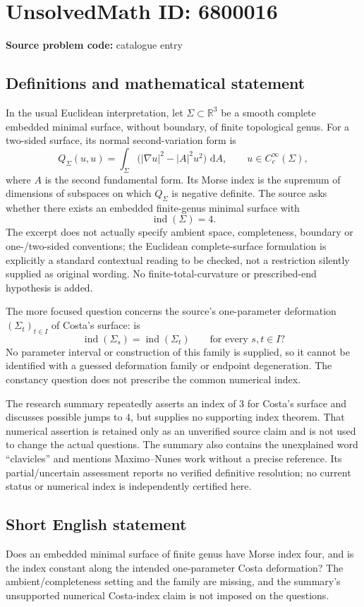 \documentclass[11pt]{article}
\newcommand{\dd}{\,\mathrm{d}}
\begin{document}
\section*{UnsolvedMath ID: 6800016}
\textbf{Source problem code:} catalogue entry
\subsection{Definitions and mathematical statement}
In the usual Euclidean interpretation, let \(\Sigma\subset\mathbb R^3\) be a smooth complete embedded minimal surface, without boundary, of finite topological genus. For a two-sided surface, its normal second-variation form is
\[
 Q_\Sigma(u,u)=\int_\Sigma\bigl(|\nabla u|^2-|A|^2u^2\bigr)\,\dd A,
 \qquad u\in C_c^\infty(\Sigma),
\]
where \(A\) is the second fundamental form. Its Morse index is the supremum of dimensions of subspaces on which \(Q_\Sigma\) is negative definite. The source asks whether there exists an embedded finite-genus minimal surface with
\[
 \operatorname{ind}(\Sigma)=4.
\]
The excerpt does not actually specify ambient space, completeness, boundary or one-/two-sided conventions; the Euclidean complete-surface formulation is explicitly a standard contextual reading to be checked, not a restriction silently supplied as original wording. No finite-total-curvature or prescribed-end hypothesis is added.

The more focused question concerns the source's one-parameter deformation \((\Sigma_t)_{t\in I}\) of Costa's surface: is
\[
 \operatorname{ind}(\Sigma_s)=\operatorname{ind}(\Sigma_t)
 \qquad\text{for every }s,t\in I?
\]
No parameter interval or construction of this family is supplied, so it cannot be identified with a guessed deformation family or endpoint degeneration. The constancy question does not prescribe the common numerical index.

The research summary repeatedly asserts an index of \(3\) for Costa's surface and discusses possible jumps to \(4\), but supplies no supporting index theorem. That numerical assertion is retained only as an unverified source claim and is not used to change the actual questions. The summary also contains the unexplained word ``clavicles'' and mentions Maximo--Nunes work without a precise reference. Its partial/uncertain assessment reports no verified definitive resolution; no current status or numerical index is independently certified here.
\subsection{Short English statement}
Does an embedded minimal surface of finite genus have Morse index four, and is the index constant along the intended one-parameter Costa deformation? The ambient/completeness setting and the family are missing, and the summary's unsupported numerical Costa-index claim is not imposed on the questions.
\end{document}
